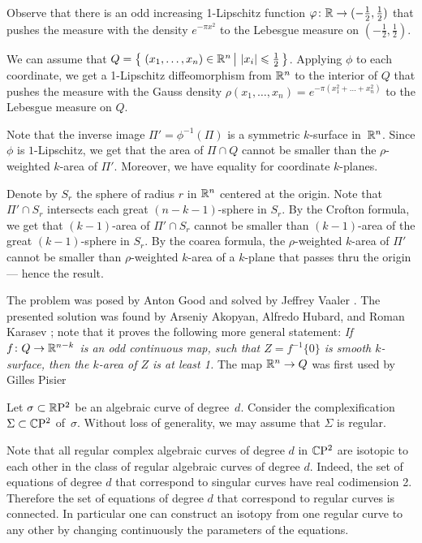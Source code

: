 Observe that there is an odd increasing 1-Lipschitz function $\varphi\colon\mathbb{R}\to(-\tfrac12,\tfrac12)$ that pushes the measure with the density $e^{-\pi x^2}$ to the Lebesgue measure on $(-\tfrac12,\tfrac12)$.

We can assume that $Q=\set{(x_1,\dots,x_n)\in \RR^n}{|x_i|\le \tfrac12}$.
Applying $\phi$ to each coordinate,
we get a 1-Lipschitz diffeomorphism from $\mathbb{R}^n$ to the interior of $Q$ that pushes the measure with the Gauss density 
$\rho(x_1,\dots,x_n)=e^{-\pi (x_1^2+\dots+x_n^2)}$ to the Lebesgue measure on $Q$.

Note that the inverse image $\Pi'=\phi^{-1}(\Pi)$ is a symmetric $k$-surface in~$\mathbb{R}^n$.
Since $\phi$ is $1$-Lipschitz, we get that the area of $\Pi\cap Q$ cannot be smaller than the $\rho$-weighted $k$-area of $\Pi'$.
Moreover, we have equality for coordinate $k$-planes.

Denote by $S_r$ the sphere of radius $r$ in $\mathbb{R}^n$ centered at the origin.
Note that $\Pi'\cap S_r$ intersects each great $(n-k-1)$-sphere in $S_r$.
By the Crofton formula, we get that $(k-1)$-area of $\Pi'\cap S_r$ cannot be smaller than $(k-1)$-area of the great $(k-1)$-sphere in $S_r$.
By the coarea formula, the $\rho$-weighted $k$-area of $\Pi'$ cannot be smaller than $\rho$-weighted $k$-area of a $k$-plane that passes thru the origin --- hence the result.
\qeds

The problem was posed by Anton Good
and solved by Jeffrey Vaaler \cite{vaaler}.
The presented solution was found by Arseniy Akopyan, Alfredo Hubard, and Roman Karasev \cite{akopyan-hubard-karasev};
note that it proves the following more general statement:
\textit{If $f\colon Q \to \mathbb{R}^{n-k}$ is an odd continuous map, such that $Z = f^{-1}\{0\}$ is smooth $k$-surface, then the $k$-area of $Z$ is at least 1.}
The map $\mathbb{R}^n\to Q$ was first used by Gilles Pisier \cite[p. 182]{pisier}



Let $\sigma\subset \mathbb{R}\mathrm{P}^2$ be an algebraic curve of degree~$d$.
Consider the complexification $\Sigma\subset \mathbb{C}\mathrm{P}^2$ of~$\sigma$.
Without loss of generality, we may assume that $\Sigma$ is regular.

Note that all regular complex algebraic curves of degree $d$ in $\mathbb{C}\mathrm{P}^2$
are isotopic to each other in the class of regular algebraic curves of degree $d$.
Indeed, the set of equations of degree $d$ that correspond to singular curves have real codimension 2.
Therefore the set of equations of degree $d$ that correspond to regular curves is connected.
In particular one can construct an isotopy from one regular curve to any other by changing continuously the parameters of the equations.

